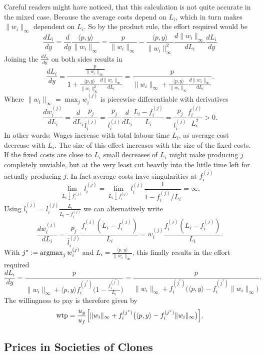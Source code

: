 Careful readers might have noticed, that
this calculation is not quite accurate in the mixed case. Because the average
costs depend on \(L_i\), which in turn makes \(\|w_i\|_\infty\) dependent on
\(L_i\). So by the product rule, the effort required would be
\[
		\frac{dL_i}{dy}
		= \frac{d}{dy} \frac{\langle p, y\rangle}{\|w_i\|_\infty}
		= \frac{p}{\|w_i\|_\infty}
		- \frac{\langle p, y\rangle}{\|w_i\|_\infty^2}
		\frac{d\|w_i\|_\infty}{dL_i}\frac{dL_i}{dy}
\]
Joining the \(\frac{dL_i}{dy}\) on both sides results in
\[
	\frac{dL_i}{dy}
	= \frac{\frac{p}{\|w_i\|_\infty}}{
		1 + \frac{\langle p, y\rangle}{\|w_i\|_\infty^2}
		\frac{d\|w_i\|_\infty}{dL_i}
	}
	= \frac{p}{
		\|w_i\|_\infty + \frac{\langle p, y\rangle}{\|w_i\|_\infty}
		\frac{d\|w_i\|_\infty}{dL_i}
	}.
\]
Where \(\|w_i\|_\infty=\max_{j} w_i^{(j)}\) is piecewise differentiable with
derivatives
\[
	\frac{dw_i^{(j)}}{dL_i}
	= \frac{d}{dL_i} \frac{p_j}{\bar{l}_i^{(j)}}
	= \frac{p_j}{l_i^{(j)}} \frac{d}{dL_i} \frac{L_i-f_i^{(j)}}{L_i}
	= \frac{p_j}{l_i^{(j)}} \frac{f_i^{(j)}}{L_i^2} > 0.
\]
In other words: Wages increase with total labour time \(L_i\), as
average cost decrease with \(L_i\). The size of this effect increases with the
size of the fixed costs. If the fixed costs are close to \(L_i\) small decreases
of \(L_i\) might make producing \(j\) completely unviable, but at the very least
cut heavily into the little time left for actually producing \(j\). In fact
average costs have singularities at \(f_i^{(j)}\)
\[
	\lim_{L_i\downarrow f_i^{(j)}} \bar{l}_i^{(j)}
	= \lim_{L_i\downarrow f_i^{(j)}}l_i^{(j)}\frac{1}{1-f_i^{(j)}/L_i}
	= \infty.
\]
Using \(\bar{l}_i^{(j)}=l_i^{(j)}\frac{L_i}{L_i-f_i^{(j)}}\) we can alternatively
write
\[
	\frac{dw_i^{(j)}}{dL_i}
	= \frac{p_j}{\bar{l}_i^{(j)}} \frac{f_i^{(j)}(L_i-f_i^{(j)})}{L_i}
	= w_i^{(j)} \frac{f_i^{(j)}(L_i-f_i^{(j)})}{L_i}.
\]
With \(j^* := \operatorname*{argmax}_{j} w_i^{(j)}\) and \(L_i = \frac{\langle p,
y\rangle}{\|w_i\|_\infty}\), this finally results in the effort required
\[
	\frac{dL_i}{dy}
	= \frac{p}{
		\|w_i\|_\infty + \langle p, y\rangle f_i^{(j^*)}
		\bigl(1-\frac{f_i^{(j^*)}}{L_i}\bigr)
	}
	= \frac{p}{
		\|w_i\|_\infty + f_i^{(j^*)}
		\bigl(\langle p, y\rangle-f_i^{(j^*)}\|w_i\|_\infty\bigr)
	}.
\]
The willingness to pay is therefore given by
\[
	\text{wtp} = \frac{u_y}{u_f}\Bigl[
		\|w_i\|_\infty + f_i^{(j^*)}
		\bigl(\langle p, y\rangle-f_i^{(j^*)}\|w_i\|_\infty\bigr)
	\Bigr].
\]

\subsection{Prices in Societies of Clones}

